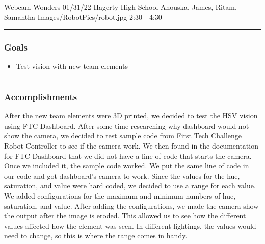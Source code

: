 \insertmeeting 
	{Webcam Wonders} 
	{01/31/22} 
	{Hagerty High School}
	{Anouska, James, Ritam, Samantha}
	{Images/RobotPics/robot.jpg}
	{2:30 - 4:30}
	
\noindent\hfil\rule{\textwidth}{.4pt}\hfil
\subsubsection*{Goals}
\begin{itemize}
    \item Test vision with new team elements  

\end{itemize} 

\noindent\hfil\rule{\textwidth}{.4pt}\hfil

\subsubsection*{Accomplishments}
After the new team elements were 3D printed, we decided to test the HSV vision using FTC Dashboard. After some time researching why dashboard would not show the camera, we decided to test sample code from First Tech Challenge Robot Controller to see if the camera work. We then found in the documentation for FTC Dashboard that we did not have a line of code that starts the camera. Once we included it, the sample code worked. We put the same line of code in our code and got dashboard's camera to work. Since the values for the hue, saturation, and value were hard coded, we decided to use a range for each value. We added configurations for the maximum and minimum numbers of hue, saturation, and value. After adding the configurations, we made the camera show the output after the image is eroded. This allowed us to see how the different values affected how the element was seen. In different lightings, the values would need to change, so this is where the range comes in handy. 
 


